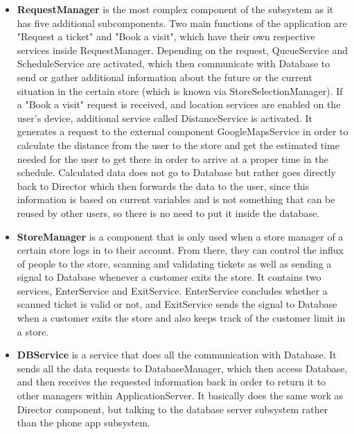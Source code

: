 \begin{itemize}
\newpage

\item \textbf{RequestManager} is the most complex component of the subsystem as it has five additional subcomponents. Two main functions of the application are "Request a ticket" and "Book a visit", which have their own respective services inside RequestManager. Depending on the request, QueueService and ScheduleService are activated, which then communicate with Database to send or gather additional information about the future or the current situation in the certain store (which is known via StoreSelectionManager). If a "Book a visit" request is received, and location services are enabled on the user's device, additional service called DistanceService is activated. It generates a request to the external component GoogleMapsService in order to calculate the distance from the user to the store and get the estimated time needed for the user to get there in order to arrive at a proper time in the schedule. Calculated data does not go to Database but rather goes directly back to Director which then forwards the data to the user, since this information is based on current variables and is not something that can be reused by other users, so there is no need to put it inside the database.  

\item \textbf{StoreManager} is a component that is only used when a store manager of a certain store logs in to their account. From there, they can control the influx of people to the store, scanning and validating tickets as well as sending a signal to Database whenever a customer exits the store. It contains two services, EnterService and ExitService. EnterService concludes whether a scanned ticket is valid or not, and ExitService sends the signal to Database when a customer exits the store and also keeps track of the customer limit in a store. 

\item \textbf{DBService} is a service that does all the communication with Database. It sends all the data requests to DatabaseManager, which then access Database, and then receives the requested information back in order to return it to other managers within ApplicationServer. It basically does the same work as Director component, but talking to the database server subsystem rather than the phone app subsystem.
\end{itemize}


\newpage
